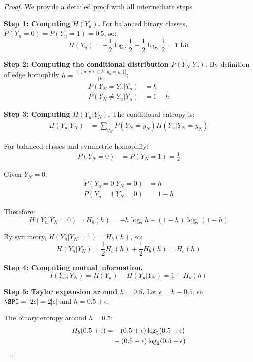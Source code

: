 \begin{proof}
We provide a detailed proof with all intermediate steps.

\textbf{Step 1: Computing $H(Y_u)$.}
For balanced binary classes, $P(Y_u = 0) = P(Y_u = 1) = 0.5$, so:
\begin{equation}
H(Y_u) = -\frac{1}{2}\log_2\frac{1}{2} - \frac{1}{2}\log_2\frac{1}{2} = 1 \text{ bit}
\end{equation}

\textbf{Step 2: Computing the conditional distribution $P(Y_N | Y_u)$.}
By definition of edge homophily $h = \frac{|\{(u,v) \in E : y_u = y_v\}|}{|E|}$:
\begin{align}
P(Y_N = Y_u | Y_u) &= h \\
P(Y_N \neq Y_u | Y_u) &= 1 - h
\end{align}

\textbf{Step 3: Computing $H(Y_u | Y_N)$.}
The conditional entropy is:
\begin{align}
H(Y_u | Y_N) &= \sum_{y_N} P(Y_N = y_N) H(Y_u | Y_N = y_N)
\end{align}

For balanced classes and symmetric homophily:
\begin{align}
P(Y_N = 0) &= P(Y_N = 1) = \frac{1}{2}
\end{align}

Given $Y_N = 0$:
\begin{align}
P(Y_u = 0 | Y_N = 0) &= h \\
P(Y_u = 1 | Y_N = 0) &= 1 - h
\end{align}

Therefore:
\begin{equation}
H(Y_u | Y_N = 0) = H_b(h) = -h\log_2 h - (1-h)\log_2(1-h)
\end{equation}

By symmetry, $H(Y_u | Y_N = 1) = H_b(h)$, so:
\begin{equation}
H(Y_u | Y_N) = \frac{1}{2}H_b(h) + \frac{1}{2}H_b(h) = H_b(h)
\end{equation}

\textbf{Step 4: Computing mutual information.}
\begin{equation}
I(Y_u; Y_N) = H(Y_u) - H(Y_u | Y_N) = 1 - H_b(h)
\end{equation}

\textbf{Step 5: Taylor expansion around $h = 0.5$.}
Let $\epsilon = h - 0.5$, so $\SPI = |2\epsilon| = 2|\epsilon|$ and $h = 0.5 + \epsilon$.

The binary entropy around $h = 0.5$:
\begin{align}
H_b(0.5 + \epsilon) &= -(0.5 + \epsilon)\log_2(0.5 + \epsilon) \notag \\
&\quad - (0.5 - \epsilon)\log_2(0.5 - \epsilon)
\end{align}


\end{proof}
